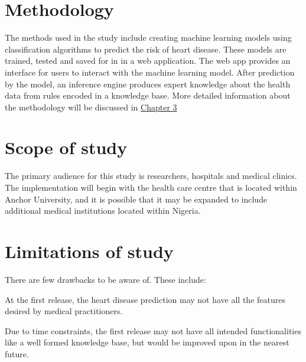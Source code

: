 \section{Methodology}
The methods used in the study include creating machine learning models using classification algorithms to predict the risk of heart disease. These models are trained, tested and saved for in in a web application. The web app provides an interface for users to interact with the machine learning model. After prediction by the model, an inference engine produces expert knowledge about the health data from rules encoded in a knowledge base. More detailed information about the methodology will be discussed in \hyperref[chap:3]{Chapter 3}

\section{Scope of study}
The primary audience for this study is researchers, hospitals and medical clinics. The implementation will begin with the health care centre that is located within Anchor University, and it is possible that it may be expanded to include additional medical institutions located within Nigeria.


\section{Limitations of study}
There are few drawbacks to be aware of. These include:

At the first release, the heart disease prediction may not have all the features desired by medical practitioners.

Due to time constraints, the first release may not have all intended functionalities like a well formed knowledge base, but would be improved upon in the nearest future.
